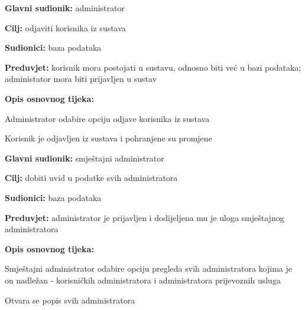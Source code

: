                         \noindent {}
					\begin{packed_item}
	
						\item \textbf{Glavni sudionik:} administrator
						\item  \textbf{Cilj:} odjaviti korisnika iz sustava
						\item  \textbf{Sudionici:} baza podataka
                            \item  \textbf{Preduvjet:} korisnik mora postojati u sustavu, odnosno biti već u bazi podataka; administator mora biti prijavljen u sustav
						\item  \textbf{Opis osnovnog tijeka:}
						
						\item[] \begin{packed_enum}
	
							\item Administrator odabire opciju odjave korisnika iz sustava
							\item Korisnik je odjavljen iz sustava i pohranjene su promjene
       
						\end{packed_enum}
						
					\end{packed_item}

                        \noindent {}
					\begin{packed_item}
	
						\item \textbf{Glavni sudionik:} smještajni administrator
						\item  \textbf{Cilj:} dobiti uvid u podatke svih administratora
						\item  \textbf{Sudionici:} baza podataka
						\item  \textbf{Preduvjet:} administrator je prijavljen i dodijeljena mu je uloga smještajnog administratora
						\item  \textbf{Opis osnovnog tijeka:}
						
						\item[] \begin{packed_enum}
	
							\item Smještajni administrator odabire opciju pregleda svih administratora kojima je on nadležan - korisničkih administratora i administratora prijevoznih usluga
							\item Otvara se popis svih administratora 
							
						\end{packed_enum}
						
					\end{packed_item}

